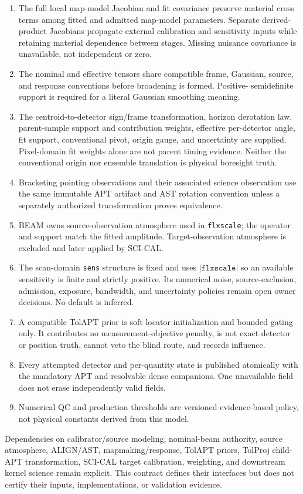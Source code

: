 \begin{enumerate}[label=\textbf{A\arabic*.}]
not authorize calibrated uncertainty under correlated residuals.
\item The full local map-model Jacobian and fit covariance preserve material
cross terms among fitted and admitted map-model parameters. Separate
derived-product Jacobians propagate external calibration and sensitivity
inputs while retaining material dependence between stages. Missing nuisance
covariance is unavailable, not independent or zero.
\item The nominal and effective tensors share compatible frame, Gaussian,
source, and response conventions before broadening is formed. Positive-
semidefinite support is required for a literal Gaussian smoothing meaning.
\item The centroid-to-detector sign/frame transformation, horizon derotation
law, parent-sample support and contribution weights, effective per-detector
angle, fit support, conventional pivot, origin gauge, and uncertainty are
supplied. Pixel-domain fit weights alone are not parent timing evidence.
Neither the conventional origin nor ensemble translation is physical
boresight truth.
\item Bracketing pointing observations and their associated science
observation use the same immutable APT artifact and AST rotation convention
unless a separately authorized transformation proves equivalence.
\item BEAM owns source-observation atmosphere used in \texttt{flxscale}; the
operator and support match the fitted amplitude. Target-observation atmosphere
is excluded and later applied by SCI-CAL.
\item The scan-domain \texttt{sens} structure is fixed and uses
$|\texttt{flxscale}|$ so an available sensitivity is finite and strictly
positive. Its numerical noise, source-exclusion, admission, exposure,
bandwidth, and uncertainty policies remain open owner decisions. No default
is inferred.
\item A compatible TolAPT prior is soft locator initialization and bounded
gating only. It contributes no measurement-objective penalty, is not exact
detector or position truth, cannot veto the blind route, and records influence.
\item Every attempted detector and per-quantity state is published atomically
with the mandatory APT and resolvable dense companions. One unavailable field
does not erase independently valid fields.
\item Numerical QC and production thresholds are versioned evidence-based
policy, not physical constants derived from this model.
\end{enumerate}

Dependencies on calibrator/source modeling, nominal-beam authority, source
atmosphere, ALIGN/AST, mapmaking/response, TolAPT priors, TolProj child-APT
transformation, SCI-CAL target calibration, weighting, and downstream kernel
science remain explicit. This contract defines their interfaces but does not
certify their inputs, implementations, or validation evidence.

